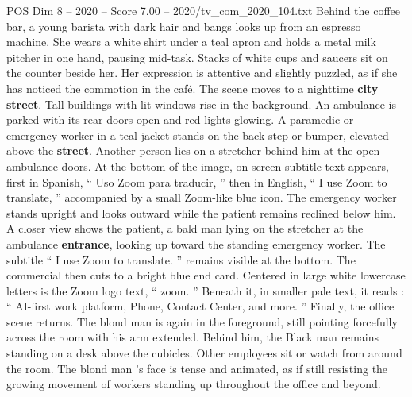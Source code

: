 \begin{textsample}{POS Dim 8 – 2020 – Score 7.00 – 2020/tv\_com\_2020\_104.txt}
Behind the coffee bar, a young barista with dark hair and bangs looks up from an espresso machine.
She wears a white shirt under a teal apron and holds a metal milk pitcher in one hand, pausing mid-task.
Stacks of white cups and saucers sit on the counter beside her.
Her expression is attentive and slightly puzzled, as if she has noticed the commotion in the café.
The scene moves to a nighttime \textbf{city} \textbf{street}.
Tall buildings with lit windows rise in the background.
An ambulance is parked with its rear doors open and red lights glowing.
A paramedic or emergency worker in a teal jacket stands on the back step or bumper, elevated above the \textbf{street}.
Another person lies on a stretcher behind him at the open ambulance doors.
At the bottom of the image, on-screen subtitle text appears, first in Spanish, “ Uso Zoom para traducir, ” then in English, “ I use Zoom to translate, ” accompanied by a small Zoom-like blue icon.
The emergency worker stands upright and looks outward while the patient remains reclined below him.
A closer view shows the patient, a bald man lying on the stretcher at the ambulance \textbf{entrance}, looking up toward the standing emergency worker.
The subtitle “ I use Zoom to translate. ” remains visible at the bottom.
The commercial then cuts to a bright blue end card.
Centered in large white lowercase letters is the Zoom logo text, “ zoom. ” Beneath it, in smaller pale text, it reads : “ AI-first work platform, Phone, Contact Center, and more. ” Finally, the office scene returns.
The blond man is again in the foreground, still pointing forcefully across the room with his arm extended.
Behind him, the Black man remains standing on a desk above the cubicles.
Other employees sit or watch from around the room.
The blond man ’s face is tense and animated, as if still resisting the growing movement of workers standing up throughout the office and beyond.

\end{textsample}
